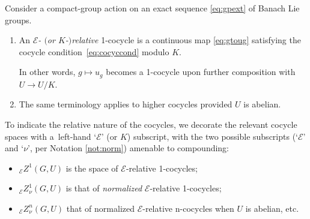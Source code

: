 \documentclass[10pt,a4paper]{amsart}
\numberwithin{equation}{section}
\newcommand\cE{{\mathcal E}}
\begin{document}
\begin{Definition}\label{def:relcocyc}
 Consider a compact-group action on an exact sequence \eqref{eq:gpext} of Banach Lie groups.
 \begin{enumerate}[(1)]\itemsep=0pt
 \item An {\it $\cE$- $($or $K$-$)$relative} 1-cocycle is a continuous map \eqref{eq:gtoug} satisfying the cocycle condition~\eqref{eq:cocyccond} modulo $K$.

 In other words, $g\mapsto u_g$ becomes a 1-cocycle upon further composition with $U\to U/K$.
 \item The same terminology applies to higher cocycles provided $U$ is abelian.
 \end{enumerate}
 To indicate the relative nature of the cocycles, we decorate the relevant cocycle spaces with a~left-hand `$\cE$' (or $K$) subscript, with the two possible subscripts (`$\cE$' and `$\nu$', per Notation \ref{not:norm}) amenable to compounding:
 \begin{itemize}\itemsep=0pt
 \item ${}_{\cE}Z^1(G,U)$ is the space of $\cE$-relative 1-cocycles;
 \item ${}_{\cE}Z^1_{\nu}(G,U)$ is that of {\it normalized} $\cE$-relative 1-cocycles;
 \item ${}_{\cE}Z^n_{\nu}(G,U)$ that of normalized $\cE$-relative n-cocycles when $U$ is abelian, etc.
 \end{itemize}
\end{Definition}
\end{document}

